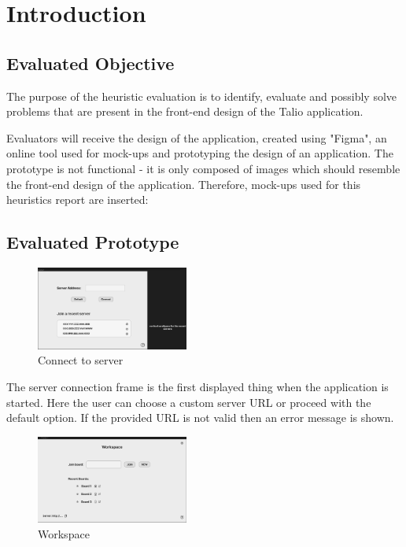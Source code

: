 \section{Introduction}

\subsection{Evaluated Objective}
The purpose of the heuristic evaluation is to identify, evaluate and possibly solve problems that are present in the front-end design of the Talio application.

Evaluators will receive the design of the application, created using "Figma", an online tool used for mock-ups and prototyping the design of an application. The prototype is not functional - it is only composed of images which should resemble the front-end design of the application. Therefore, mock-ups used for this heuristics report are inserted:

\subsection{Evaluated Prototype}

\begin{figure}[H]
\includegraphics[width=5cm]{content/mockups/server_connect.png} 
\caption{Connect to server}
\end{figure}

The server connection frame is the first displayed thing when the application is started. Here the user can choose a custom server URL or proceed with the default option. If the provided URL is not valid then an error message is shown.

\begin{figure}[H]
\includegraphics[width=5cm]{content/mockups/workspace.png} 
\caption{Workspace}
\end{figure}

